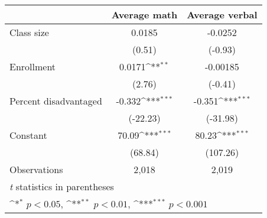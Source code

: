 {
\def\sym#1{\ifmmode^{#1}\else\(^{#1}\)\fi}
\begin{tabular}{l*{2}{c}}
\hline\hline
          &\multicolumn{1}{c}{Average math}&\multicolumn{1}{c}{Average verbal}\\
\hline
Class size&   0.0185         &  -0.0252         \\
          &   (0.51)         &  (-0.93)         \\
Enrollment&   0.0171\sym{**} & -0.00185         \\
          &   (2.76)         &  (-0.41)         \\
Percent disadvantaged&   -0.332\sym{***}&   -0.351\sym{***}\\
          & (-22.23)         & (-31.98)         \\
Constant  &    70.09\sym{***}&    80.23\sym{***}\\
          &  (68.84)         & (107.26)         \\
\hline
Observations&    2,018         &    2,019         \\
\hline\hline
\multicolumn{3}{l}{\footnotesize \textit{t} statistics in parentheses}\\
\multicolumn{3}{l}{\footnotesize \sym{*} \(p<0.05\), \sym{**} \(p<0.01\), \sym{***} \(p<0.001\)}\\
\end{tabular}
}
